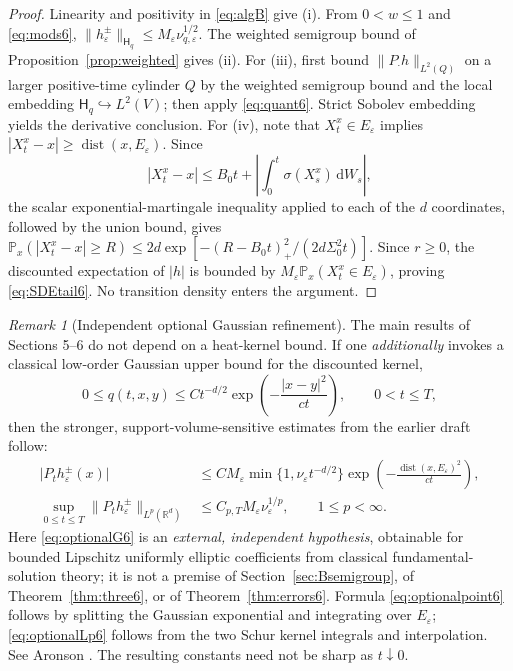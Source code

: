 \documentclass[11pt,a4paper]{article}
\theoremstyle{definition}\newtheorem{definition}{Definition}[section]\newtheorem{example}[theorem]{Example}
\theoremstyle{remark}\newtheorem{remark}[theorem]{Remark}\newtheorem{remarkSix}{Remark}[section]
\newcommand{\Rd}{\mathbb R^d}
\newcommand{\dd}{\,\mathrm d}
\newcommand{\norm}[1]{\lVert #1\rVert}
\newcommand{\abs}[1]{\lvert #1\rvert}
\newcommand{\HH}{\mathsf H_q}
\begin{document}
\begin{proof}
Linearity and positivity in \eqref{eq:algB} give (i). From $0<w\le1$ and \eqref{eq:mods6}, $\norm{h_\varepsilon^\pm}_{\HH}\le M_\varepsilon\nu_{q,\varepsilon}^{1/2}$. The weighted semigroup bound of Proposition~\ref{prop:weighted} gives (ii). For (iii), first bound $\norm{P_\cdot h}_{L^2(Q)}$ on a larger positive-time cylinder $Q$ by the weighted semigroup bound and the local embedding $\HH\hookrightarrow L^2(V)$; then apply \eqref{eq:quant6}. Strict Sobolev embedding yields the derivative conclusion. For (iv), note that $X_t^x\in E_\varepsilon$ implies $|X_t^x-x|\ge\operatorname{dist}(x,E_\varepsilon)$. Since
\[
 |X_t^x-x|\le B_0t+\left|\int_0^t\sigma(X_s^x)\dd W_s\right|,
\]
the scalar exponential-martingale inequality applied to each of the $d$ coordinates, followed by the union bound, gives
$\mathbb P_x(|X_t^x-x|\ge R)\le2d\exp[-(R-B_0t)_+^2/(2d\Sigma_0^2t)]$. Since $r\ge0$, the discounted expectation of $|h|$ is bounded by $M_\varepsilon\mathbb P_x(X_t^x\in E_\varepsilon)$, proving \eqref{eq:SDEtail6}. No transition density enters the argument.
\end{proof}

\begin{remarkSix}[Independent optional Gaussian refinement]\label{rem:optionalG6}
The main results of Sections 5--6 do not depend on a heat-kernel bound. If one \emph{additionally} invokes a classical low-order Gaussian upper bound for the discounted kernel,
\begin{equation}\label{eq:optionalG6}
 0\le q(t,x,y)\le Ct^{-d/2}\exp\!\left(-\frac{|x-y|^2}{ct}\right),
 \qquad 0<t\le T,
\end{equation}
then the stronger, support-volume-sensitive estimates from the earlier draft follow:
\begin{align}
 \abs{P_th_\varepsilon^\pm(x)}
 &\le CM_\varepsilon\min\{1,\nu_\varepsilon t^{-d/2}\}
 \exp\!\left(-\frac{\operatorname{dist}(x,E_\varepsilon)^2}{ct}\right),
 \label{eq:optionalpoint6}\\
 \sup_{0\le t\le T}\norm{P_th_\varepsilon^\pm}_{L^p(\Rd)}
 &\le C_{p,T}M_\varepsilon\nu_\varepsilon^{1/p},
 \qquad 1\le p<\infty.\label{eq:optionalLp6}
\end{align}
Here \eqref{eq:optionalG6} is an \emph{external, independent hypothesis}, obtainable for bounded Lipschitz uniformly elliptic coefficients from classical fundamental-solution theory; it is not a premise of Section~\ref{sec:Bsemigroup}, of Theorem~\ref{thm:three6}, or of Theorem~\ref{thm:errors6}. Formula \eqref{eq:optionalpoint6} follows by splitting the Gaussian exponential and integrating over $E_\varepsilon$; \eqref{eq:optionalLp6} follows from the two Schur kernel integrals and interpolation. See Aronson \cite{aronson67,aronson68}. The resulting constants need not be sharp as $t\downarrow0$.
\end{remarkSix}
\end{document}
